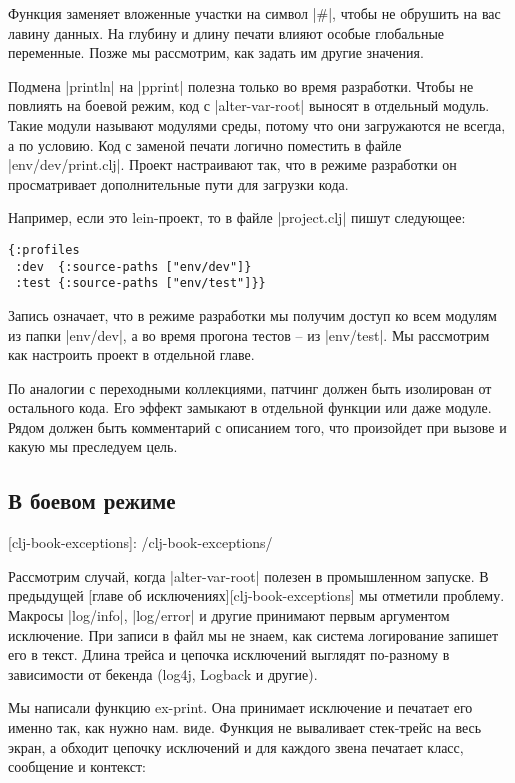 Функция заменяет вложенные участки на символ \spverb|#|, чтобы не обрушить на вас лавину
данных. На глубину и длину печати влияют особые глобальные переменные. Позже мы
рассмотрим, как задать им другие значения.

Подмена \spverb|println| на \spverb|pprint| полезна только во время разработки. Чтобы не
повлиять на боевой режим, код с \spverb|alter-var-root| выносят в отдельный
модуль. Такие модули называют модулями среды, потому что они загружаются не
всегда, а по условию. Код с заменой печати логично поместить в файле
\spverb|env/dev/print.clj|. Проект настраивают так, что в режиме разработки он
просматривает дополнительные пути для загрузки кода.

Например, если это lein-проект, то в файле \spverb|project.clj| пишут следующее:

\begin{verbatim}
{:profiles
 :dev  {:source-paths ["env/dev"]}
 :test {:source-paths ["env/test"]}}
\end{verbatim}

Запись означает, что в режиме разработки мы получим доступ ко всем модулям из
папки \spverb|env/dev|, а во время прогона тестов -- из \spverb|env/test|. Мы рассмотрим как
настроить проект в отдельной главе.

По аналогии с переходными коллекциями, патчинг должен быть изолирован от
остального кода. Его эффект замыкают в отдельной функции или даже модуле. Рядом
должен быть комментарий с описанием того, что произойдет при вызове и какую мы
преследуем цель.

\subsection{В боевом режиме}

[clj-book-exceptions]: /clj-book-exceptions/

Рассмотрим случай, когда \spverb|alter-var-root| полезен в промышленном запуске. В
предыдущей [главе об исключениях][clj-book-exceptions] мы отметили
проблему. Макросы \spverb|log/info|, \spverb|log/error| и другие принимают первым аргументом
исключение. При записи в файл мы не знаем, как система логирование запишет его в
текст. Длина трейса и цепочка исключений выглядят по-разному в зависимости от
бекенда (log4j, Logback и другие).

Мы написали функцию ex-print. Она принимает исключение и печатает его именно
так, как нужно нам. виде. Функция не вываливает стек-трейс на весь экран, а
обходит цепочку исключений и для каждого звена печатает класс, сообщение и
контекст:

